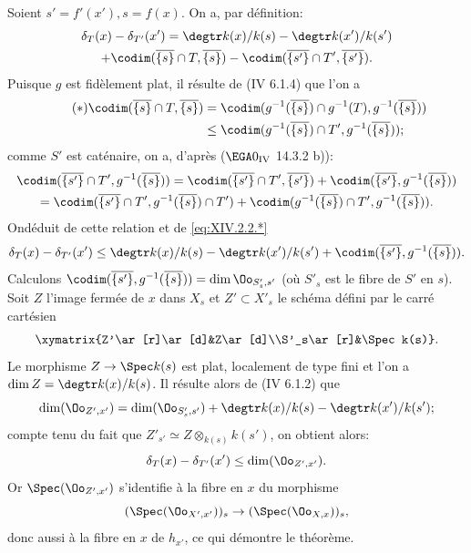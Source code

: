 Soient $s'=f'(x'), s=f(x)$. On a, par d\'efinition:
\begin{multline*}
\delta_T(x)-\delta_{T'}(x')=\degtr k(x)/k(s)-\degtr k(x')/k(s')\\
+\codim(\overline{\{s\}}\cap T, \overline{\{s\}})-\codim(\overline{\{s'\}}\cap T', \overline{\{s'\}}).
\end{multline*}
Puisque $g$ est fid\`element plat, il r\'esulte de (\EGA IV 6.1.4) que l'on a
\begin{align*} \label{eq:XIV.2.2.*} \tag{$*$}
\codim(\overline{\{s\}}\cap T, \overline{\{s\}})&=\codim(g^{-1}(\overline{\{s\}})\cap g^{-1}(T), g^{-1}(\overline{\{s\}}))\\&\leq\codim(g^{-1}(\overline{\{s\}})\cap T', g^{-1}(\overline{\{s\}}));
\end{align*}
comme $S'$ est cat\'enaire, on a, d'apr\`es ($\EGA 0_{\textup{IV}}$ 14.3.2 b)):
\begin{multline*}
\codim(\overline{\{s'\}}\cap T', g^{-1}(\overline{\{s\}}))= \codim(\overline{\{s'\}}\cap T', \overline{\{s'\}})+ \codim(\overline{\{s'\}}, g^{-1}(\overline{\{s\}}))\\
= \codim(\overline{\{s'\}}\cap T', g^{-1}(\overline{\{s\}})\cap T')+ \codim(g^{-1}(\overline{\{s\}})\cap T', g^{-1}(\overline{\{s\}})).
\end{multline*}
On\pageoriginale d\'eduit de cette relation et de \eqref{eq:XIV.2.2.*}
$$
\delta_T(x)-\delta_{T'}(x')\leq\degtr k(x)/k(s)-\degtr k(x')/k(s')+\codim(\overline{\{s'\}}, g^{-1}(\overline{\{s\}})).
$$
Calculons $\codim(\overline{\{s'\}}, g^{-1}(\overline{\{s\}}))=\dim\Oo_{S'_s, s'}$ (o\`u $S'_s$ est le fibre de $S'$ en $s$). Soit $Z$ l'image ferm\'ee de $x$ dans $X_s$ et $Z'\subset X'_s$ le sch\'ema d\'efini par le carr\'e cart\'esien
$$
\xymatrix{Z'\ar[r]\ar[d]&Z\ar[d]\\S'_s\ar[r]&\Spec k(s)}.
$$
Le morphisme $Z\to \Spec k(s)$ est plat, localement de type fini et l'on a $\dim Z=\degtr k(x)/k(s)$. Il r\'esulte alors de (\EGA IV 6.1.2) que
$$
\dim(\Oo_{Z', x'})=\dim(\Oo_{S'_s, s'})+\degtr k(x)/k(s)-\degtr k(x')/k(s');$$
compte tenu du fait que $Z'_{s'}\simeq Z\otimes_{k(s)}k(s')$, on obtient alors:
$$
\delta_T(x)-\delta_{T'}(x')\leq\dim(\Oo_{Z', x'}).
$$
Or $\Spec(\Oo_{Z', x'})$ s'identifie \`a la fibre en $x$ du morphisme
$$(\Spec(\Oo_{X', x'}))_s\to(\Spec(\Oo_{X, x}))_s,
$$
donc aussi \`a la fibre en $x$ de $h_{x'}$, ce qui d\'emontre le th\'eor\`eme.

